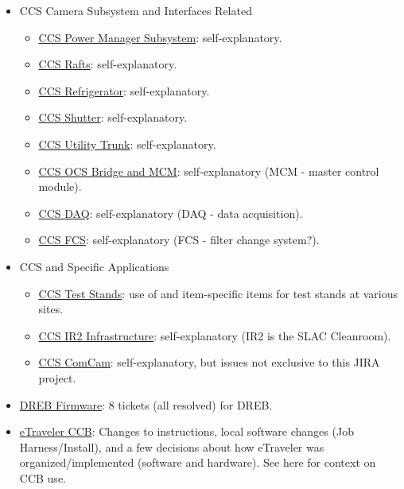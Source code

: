 \begin{itemize}
	\item CCS Camera Subsystem and Interfaces Related
		\begin{itemize}
		\item \href{https://jira.slac.stanford.edu/browse/LSSTCCSPOWER}{CCS Power Manager Subsystem}:  self-explanatory.
		\item \href{https://jira.slac.stanford.edu/browse/LSSTCCSRAFTS}{CCS Rafts}:  self-explanatory.
		\item \href{https://jira.slac.stanford.edu/browse/LSSTCCSREFRIG}{CCS Refrigerator}:  self-explanatory.
		\item \href{https://jira.slac.stanford.edu/browse/LSSTCCSSHUTTER}{CCS Shutter}:  self-explanatory.
		\item \href{https://jira.slac.stanford.edu/browse/LSSTCCSUT}{CCS Utility Trunk}:  self-explanatory.
		\item \href{https://jira.slac.stanford.edu/browse/LCOBM}{CCS OCS Bridge and MCM}:  self-explanatory (MCM - master control module).
		\item \href{https://jira.slac.stanford.edu/browse/LSSTCCSDAQ}{CCS DAQ}:  self-explanatory (DAQ - data acquisition).
		\item \href{https://jira.slac.stanford.edu/browse/LSSTCCSFCS}{CCS FCS}:  self-explanatory (FCS - filter change system?).	
	\end{itemize}
	\item CCS and Specific Applications
	\begin{itemize}
		\item \href{https://jira.slac.stanford.edu/browse/LSSTCCSTS}{CCS Test Stands}:  use of and item-specific items for test stands at various sites.
		\item \href{https://jira.slac.stanford.edu/browse/LSSTIR}{CCS IR2 Infrastructure}:  self-explanatory (IR2 is the SLAC Cleanroom).
		\item \href{https://jira.slac.stanford.edu/browse/LSSTCCSCOM}{CCS ComCam}:  self-explanatory, but issues not exclusive to this JIRA project.
	\end{itemize}
	\item \href{https://jira.slac.stanford.edu/browse/LSSTDREB}{DREB Firmware}:  8 tickets (all resolved) for DREB.
	\item \href{https://jira.slac.stanford.edu/browse/ETCCB}{eTraveler CCB}:  Changes to instructions, local software changes (Job Harness/Install), and a few decisions about how eTraveler was organized/implemented (software and hardware). See here for context on CCB use.
\end{itemize}

